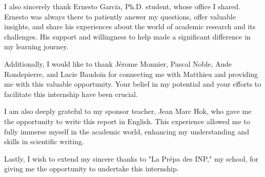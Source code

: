 \documentclass[a4paper,12pt]{article}
\theoremstyle{definition}
\theoremstyle{plain}
\begin{document}
I also sincerely thank Ernesto Garcia, Ph.D. student, whose office I shared. Ernesto was always there to patiently answer my questions, offer valuable insights, and share his experiences about the world of academic research and its challenges. His support and willingness to help made a significant difference in my learning journey.

Additionally, I would like to thank Jérome Monnier, Pascal Noble, Aude Rondepierre, and Lucie Baudoin for connecting me with Matthieu and providing me with this valuable opportunity. Your belief in my potential and your efforts to facilitate this internship have been crucial.

I am also deeply grateful to my sponsor teacher, Jean Marc Hok, who gave me the opportunity to write this report in English. This experience allowed me to fully immerse myself in the academic world, enhancing my understanding and skills in scientific writing.

Lastly, I wish to extend my sincere thanks to "La Prépa des INP," my school, for giving me the opportunity to undertake this internship.

\newpage
\tableofcontents
\newpage
\end{document}
